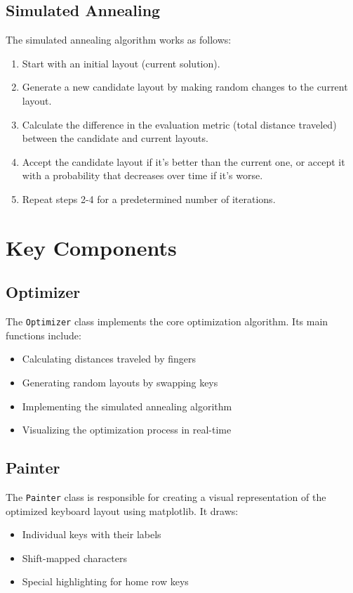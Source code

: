 \documentclass{article}
\begin{document}
\subsection{Simulated Annealing}
The simulated annealing algorithm works as follows:
\begin{enumerate}
    \item Start with an initial layout (current solution).
    \item Generate a new candidate layout by making random changes to the current layout.
    \item Calculate the difference in the evaluation metric (total distance traveled) between the candidate and current layouts.
    \item Accept the candidate layout if it's better than the current one, or accept it with a probability that decreases over time if it's worse.
    \item Repeat steps 2-4 for a predetermined number of iterations.
\end{enumerate}

\section{Key Components}

\subsection{Optimizer}
The \texttt{Optimizer} class implements the core optimization algorithm. Its main functions include:
\begin{itemize}
    \item Calculating distances traveled by fingers
    \item Generating random layouts by swapping keys
    \item Implementing the simulated annealing algorithm
    \item Visualizing the optimization process in real-time
\end{itemize}

\subsection{Painter}
The \texttt{Painter} class is responsible for creating a visual representation of the optimized keyboard layout using matplotlib. It draws:
\begin{itemize}
    \item Individual keys with their labels
    \item Shift-mapped characters
    \item Special highlighting for home row keys
\end{itemize}
\end{document}
